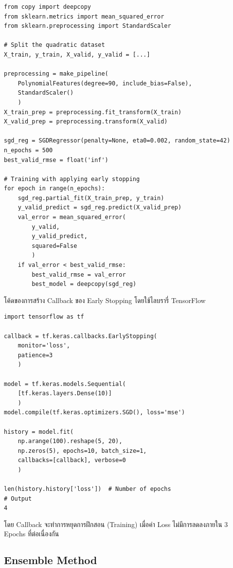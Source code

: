 \begin{lstlisting}[style=MyPython]
from copy import deepcopy
from sklearn.metrics import mean_squared_error
from sklearn.preprocessing import StandardScaler

# Split the quadratic dataset
X_train, y_train, X_valid, y_valid = [...]

preprocessing = make_pipeline(
    PolynomialFeatures(degree=90, include_bias=False),
    StandardScaler()
    )
X_train_prep = preprocessing.fit_transform(X_train)
X_valid_prep = preprocessing.transform(X_valid)

sgd_reg = SGDRegressor(penalty=None, eta0=0.002, random_state=42)
n_epochs = 500
best_valid_rmse = float('inf')

# Training with applying early stopping
for epoch in range(n_epochs):
    sgd_reg.partial_fit(X_train_prep, y_train)
    y_valid_predict = sgd_reg.predict(X_valid_prep)
    val_error = mean_squared_error(
        y_valid, 
        y_valid_predict, 
        squared=False
        )
    if val_error < best_valid_rmse:
        best_valid_rmse = val_error
        best_model = deepcopy(sgd_reg)
\end{lstlisting}

\vspace{1em}
\noindent โค้ดของการสร้าง Callback ของ Early Stopping โดยใช้ไลบรารี่ TensorFlow 

\begin{lstlisting}[style=MyPython]
import tensorflow as tf

callback = tf.keras.callbacks.EarlyStopping(
    monitor='loss', 
    patience=3
    )

model = tf.keras.models.Sequential(
    [tf.keras.layers.Dense(10)]
    )
model.compile(tf.keras.optimizers.SGD(), loss='mse')

history = model.fit(
    np.arange(100).reshape(5, 20), 
    np.zeros(5), epochs=10, batch_size=1, 
    callbacks=[callback], verbose=0
    )

len(history.history['loss'])  # Number of epochs
# Output
4
\end{lstlisting}

\noindent โดย Callback จะทำการหยุดการฝึกสอน (Training) เมื่อค่า Loss ไม่มีการลดลงภายใน 3 Epochs ที่ต่อเนื่องกัน

\subsection{Ensemble Method}
\label{ssec:ensemble_model}

